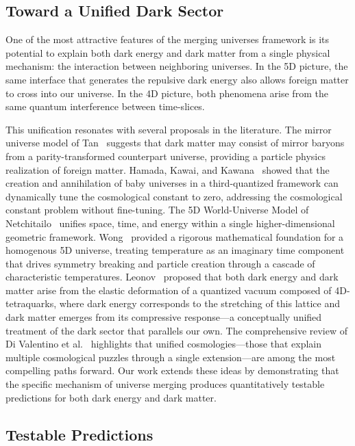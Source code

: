 \documentclass[12pt]{article}
\begin{document}
\subsection{Toward a Unified Dark Sector}

One of the most attractive features of the merging universes framework is its potential to explain both dark energy and dark matter from a single physical mechanism: the interaction between neighboring universes. In the 5D picture, the same interface that generates the repulsive dark energy also allows foreign matter to cross into our universe. In the 4D picture, both phenomena arise from the same quantum interference between time-slices.

This unification resonates with several proposals in the literature. The mirror universe model of Tan~\cite{tan} suggests that dark matter may consist of mirror baryons from a parity-transformed counterpart universe, providing a particle physics realization of foreign matter. Hamada, Kawai, and Kawana~\cite{hamada2022} showed that the creation and annihilation of baby universes in a third-quantized framework can dynamically tune the cosmological constant to zero, addressing the cosmological constant problem without fine-tuning. The 5D World-Universe Model of Netchitailo~\cite{netchitailo2015} unifies space, time, and energy within a single higher-dimensional geometric framework. Wong~\cite{wong2024} provided a rigorous mathematical foundation for a homogenous 5D universe, treating temperature as an imaginary time component that drives symmetry breaking and particle creation through a cascade of characteristic temperatures. Leonov~\cite{leonov2024} proposed that both dark energy and dark matter arise from the elastic deformation of a quantized vacuum composed of 4D-tetraquarks, where dark energy corresponds to the stretching of this lattice and dark matter emerges from its compressive response---a conceptually unified treatment of the dark sector that parallels our own. The comprehensive review of Di Valentino et al.~\cite{divalentino2021} highlights that unified cosmologies---those that explain multiple cosmological puzzles through a single extension---are among the most compelling paths forward. Our work extends these ideas by demonstrating that the specific mechanism of universe merging produces quantitatively testable predictions for both dark energy and dark matter.

\subsection{Testable Predictions}
\end{document}
